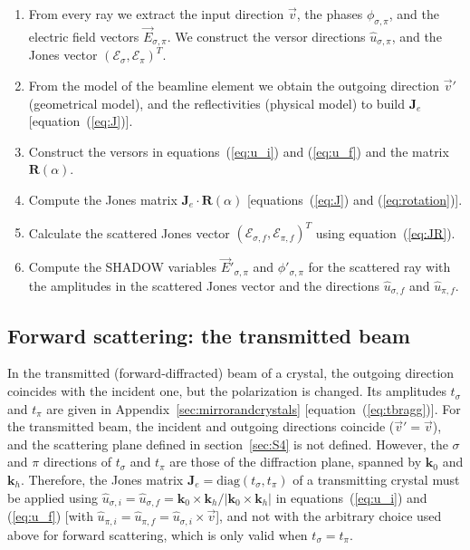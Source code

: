 \documentclass{iucr}
\begin{document}
\begin{enumerate}

\item From every ray we extract the input direction $\vec{v}$, the phases $\phi_{\sigma,\pi}$, and the electric field vectors $\vec{E}_{\sigma,\pi}$. We construct the versor directions $\hat{u}_{\sigma,\pi}$, and the Jones vector $(\mathcal{E}_\sigma, \mathcal{E}_\pi)^T$.

\item From the model of the beamline element we obtain the outgoing direction $\vec{v}'$ (geometrical model), and the reflectivities (physical model) to build $\mathbf{J}_e$ [equation~(\ref{eq:J})].

\item Construct the versors in equations~(\ref{eq:u_i}) and (\ref{eq:u_f}) and the matrix $\textbf{R}(\alpha)$.


\item Compute the Jones matrix $\textbf{J}_e \cdot \textbf{R}(\alpha)$ [equations~(\ref{eq:J}) and (\ref{eq:rotation})].

\item Calculate the scattered Jones vector $(\mathcal{E}_{\sigma,f}, \mathcal{E}_{\pi,f})^T$ using equation~(\ref{eq:JR}).

\item Compute the SHADOW variables $\vec{E}'_{\sigma,\pi}$ and $\phi'_{\sigma,\pi}$ for the scattered ray with the amplitudes in the scattered Jones vector and the directions $\hat{u}_{\sigma,f}$ and $\hat{u}_{\pi,f}$.
\end{enumerate}


\subsection{Forward scattering: the transmitted beam}\label{sec:forward}

In the transmitted (forward-diffracted) beam of a crystal, the outgoing direction coincides with the incident one, but the polarization is changed. Its amplitudes $t_\sigma$ and $t_\pi$ are given in Appendix~\ref{sec:mirrorandcrystals} [equation~(\ref{eq:tbragg})].
For the transmitted beam, the incident and outgoing directions coincide ($\vec{v}'=\vec{v}$), and the scattering plane defined in section~\ref{sec:S4} is not defined. However, the $\sigma$ and $\pi$ directions of $t_\sigma$ and $t_\pi$ are those of the diffraction plane, spanned by $\mathbf{k}_0$ and $\mathbf{k}_h$. Therefore, the Jones matrix $\textbf{J}_e=\mathrm{diag}(t_\sigma,t_\pi)$ of a transmitting crystal must be applied using $\hat{u}_{\sigma,i}=\hat{u}_{\sigma,f}=\mathbf{k}_0\times\mathbf{k}_h/|\mathbf{k}_0\times\mathbf{k}_h|$ in equations~(\ref{eq:u_i}) and (\ref{eq:u_f}) [with $\hat{u}_{\pi,i}=\hat{u}_{\pi,f}=\hat{u}_{\sigma,i}\times\vec{v}$], and not with the arbitrary choice used above for forward scattering, which is only valid when $t_\sigma=t_\pi$.
\end{document}
